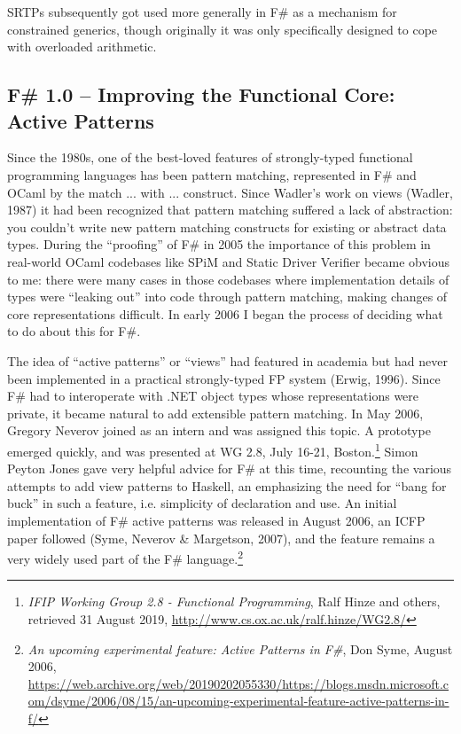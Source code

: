 \documentclass[acmsmall]{acmart}\settopmatter{}
\begin{document}
SRTPs subsequently got used more generally in F\# as a mechanism for constrained generics, though originally it was only specifically designed to cope with overloaded arithmetic.


\subsection*{F\# 1.0 – Improving the Functional Core: Active Patterns}

Since the 1980s, one of the best-loved features of strongly-typed functional programming languages has been pattern matching, represented in F\# and OCaml by the match ... with ... construct. Since Wadler’s work on views (Wadler, 1987) it had been recognized that pattern matching suffered a lack of abstraction: you couldn’t write new pattern matching constructs for existing or abstract data types.  During the “proofing” of F\# in 2005 the importance of this problem in real-world OCaml codebases like SPiM and Static Driver Verifier became obvious to me: there were many cases in those codebases where implementation details of types were “leaking out” into code through pattern matching, making changes of core representations difficult.  In early 2006 I began the process of deciding what to do about this for F\#.  

The idea of “active patterns” or “views” had featured in academia but had never been implemented in a practical strongly-typed FP system (Erwig, 1996).  Since F\# had to interoperate with .NET object types whose representations were private, it became natural to add extensible pattern matching. In May 2006, Gregory Neverov joined as an intern and was assigned this topic.  A prototype emerged quickly, and was presented at WG 2.8, July 16-21, Boston.\footnote{\textit{IFIP Working Group 2.8 - Functional Programming}, Ralf Hinze and others, retrieved 31 August 2019, \url{http://www.cs.ox.ac.uk/ralf.hinze/WG2.8/}}  Simon Peyton Jones gave very helpful advice for F\# at this time, recounting the various attempts to add view patterns to Haskell, an emphasizing the need for “bang for buck” in such a feature, i.e. simplicity of declaration and use. An initial implementation of F\# active patterns was released in August 2006, an ICFP paper followed (Syme, Neverov \& Margetson, 2007), and the feature remains a very widely used part of the F\# language.\footnote{\textit{An upcoming experimental feature: Active Patterns in F\#}, Don Syme, August 2006, \url{https://web.archive.org/web/20190202055330/https://blogs.msdn.microsoft.com/dsyme/2006/08/15/an-upcoming-experimental-feature-active-patterns-in-f/}}
\end{document}
